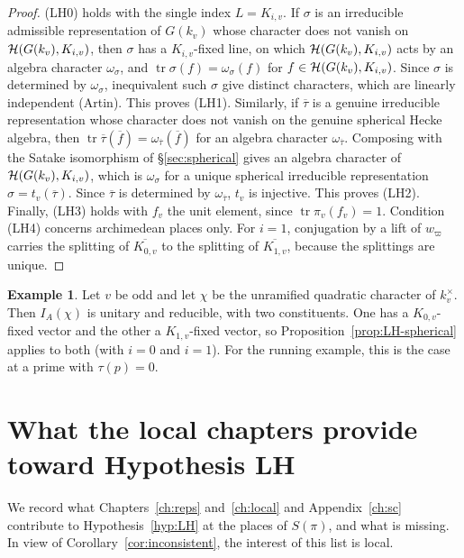 \documentclass[12pt,letterpaper,openany]{book}
\theoremstyle{plain}
\theoremstyle{definition}
\newtheorem{example}[theorem]{Example}
\theoremstyle{remark}
\theoremstyle{remark}
\newcommand{\tr}{\operatorname{tr}}
\begin{document}
\begin{proof} (LH0) holds with the single index $L=K_{i,v}$. If $\sigma$ is an
irreducible admissible representation of $G(k_v)$ whose character does
not vanish on ${\cal H}(G(k_v),K_{i,v})$, then $\sigma$ has a
$K_{i,v}$-fixed line, on which ${\cal H}(G(k_v),K_{i,v})$ acts by an
algebra character $\omega_\sigma$, and $\tr \sigma(f)=\omega_\sigma(f)$
for $f\in{\cal H}(G(k_v),K_{i,v})$. Since $\sigma$ is determined by
$\omega_\sigma$, inequivalent such $\sigma$ give distinct characters,
which are linearly independent (Artin). This proves (LH1). Similarly,
if $\overline{\tau}$ is a genuine irreducible representation whose
character does not vanish on the genuine spherical Hecke algebra, then
$\tr \overline{\tau}(\overline{f})=\omega_{\overline{\tau}}(\overline{f})$
for an algebra character $\omega_{\overline{\tau}}$. Composing with the
Satake isomorphism of \S\ref{sec:spherical} gives an algebra character
of ${\cal H}(G(k_v),K_{i,v})$, which is $\omega_\sigma$ for a unique
spherical irreducible representation $\sigma=t_v(\overline{\tau})$.
Since $\overline{\tau}$ is determined by $\omega_{\overline{\tau}}$,
$t_v$ is injective. This proves (LH2). Finally, (LH3) holds with
$f_v$ the unit element, since $\tr \pi_v(f_v)=1$. Condition (LH4) concerns
archimedean places only. For $i=1$, conjugation by a lift of $w_\varpi$
carries the splitting of $\overline{K_{0,v}}$ to the splitting of
$\overline{K_{1,v}}$, because the splittings are unique.
\end{proof}

\begin{example}
Let $v$ be odd and let $\chi$ be the unramified quadratic character of
$k_v^\times$. Then $I_A(\chi)$ is unitary and reducible, with two
constituents. One has a $K_{0,v}$-fixed vector and the other a
$K_{1,v}$-fixed vector, so Proposition~\ref{prop:LH-spherical} applies to
both (with $i=0$ and $i=1$). For the running example, this is the case at
a prime with $\tau(p)=0$.
\end{example}

\section{What the local chapters provide toward Hypothesis LH}
\label{sec:LH-status}

We record what Chapters~\ref{ch:reps} and~\ref{ch:local} and
Appendix~\ref{ch:sc} contribute to Hypothesis~\ref{hyp:LH} at the places of
$S(\pi)$, and what is missing. In view of
Corollary~\ref{cor:inconsistent}, the interest of this list is local.
\end{document}
